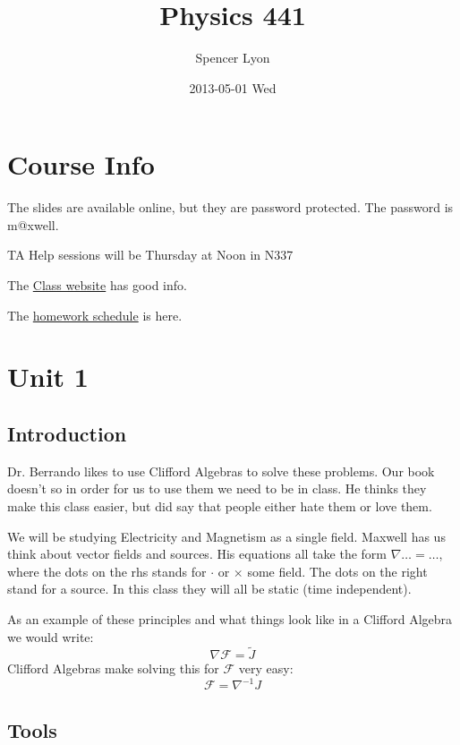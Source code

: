 \documentclass[11pt]{article}
\title{Physics 441}
\author{Spencer Lyon}
\date{2013-05-01 Wed}
\begin{document}
\maketitle

\setcounter{tocdepth}{3}
\tableofcontents
\vspace*{1cm}


\section{Course Info}
\label{sec-1}

The slides are available online, but they are password protected. The password
is m@xwell.

TA Help sessions will be Thursday at Noon in N337

The \href{http://www.physics.byu.edu/faculty/berrondo/sp441/}{Class website} has good info.

The \href{http://www.physics.byu.edu/faculty/berrondo/sp441/homework12.html}{homework schedule} is here.
\section{Unit 1}
\label{sec-2}
\subsection{Introduction}
\label{sec-2-1}

Dr. Berrando likes to use Clifford Algebras to solve these problems. Our book
doesn't so in order for us to use them we need to be in class. He thinks they
make this class easier, but did say that people either hate them or love them.

We will be studying Electricity and Magnetism as a single field. Maxwell has us
think about vector fields and sources. His equations all take the form $\nabla
\dots = \dots$, where the dots on the rhs stands for $\cdot$ or $\times$ some
field. The dots on the right stand for a source. In this class they will all be
static (time independent).

As an example of these principles and what things look like in a Clifford
Algebra we would write: $$\nabla \mathscr{F} = \tilde{J}$$ Clifford Algebras
make solving this for $\mathscr{F}$ very easy: $$\mathscr{F}=\nabla^{-1}J$$
\subsection{Tools}
\label{sec-2-2}
\end{document}
